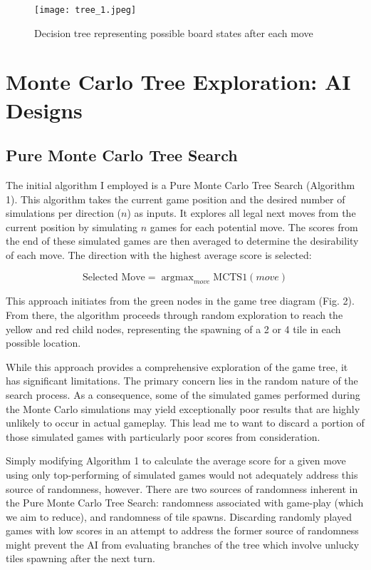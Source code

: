 \documentclass{article}
\DeclareMathOperator*{\argmax}{argmax}
\begin{document}
\begin{figure}[H]
\centering
\texttt{[image: tree\_1.jpeg]}
\caption{Decision tree representing possible board states after each move}
\label{fig:tree1}
\end{figure}

\section{Monte Carlo Tree Exploration: AI Designs}
\subsection{Pure Monte Carlo Tree Search}
The initial algorithm I employed is a Pure Monte Carlo Tree Search (Algorithm 1). This algorithm takes the current game position and the desired number of simulations per direction ($n$) as inputs. It explores all legal next moves from the current position by simulating $n$ games for each potential move. The scores from the end of these simulated games are then averaged to determine the desirability of each move. The direction with the highest average score is selected: 

\begin{equation}
  \textrm{Selected Move} = \argmax_{move} \text{MCTS1}(move)
\end{equation}


This approach initiates from the green nodes in the game tree diagram (Fig. 2). From there, the algorithm proceeds through random exploration to reach the yellow and red child nodes, representing the spawning of a 2 or 4 tile in each possible location.

While this approach provides a comprehensive exploration of the game tree, it has significant limitations. The primary concern lies in the random nature of the search process. As a consequence, some of the simulated games performed during the Monte Carlo simulations may yield exceptionally poor results that are highly unlikely to occur in actual gameplay.  This lead me to want to discard a portion of those simulated games with particularly poor scores from consideration.

Simply modifying Algorithm 1 to calculate the average score for a given move using only top-performing of simulated games would not adequately address this source of randomness, however.  There are two sources of randomness inherent in the Pure Monte Carlo Tree Search: randomness associated with game-play (which we aim to reduce), and randomness of tile spawns.  Discarding randomly played games with low scores in an attempt to address the former source of randomness might prevent the AI from evaluating branches of the tree which involve unlucky tiles spawning after the next turn.
\end{document}
